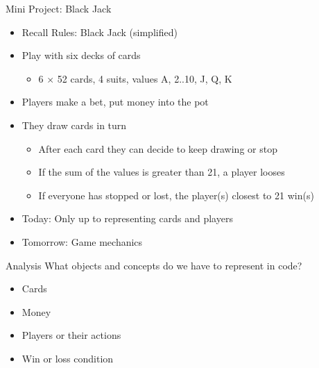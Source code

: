 \begin{frame}[fragile]{Mini Project: Black Jack}
%
\begin{itemize}
\item Recall Rules: Black Jack (simplified)
\item Play with six decks of cards
	\begin{itemize}
	\item 6 $\times$ 52 cards, 4 suits, values A, 2..10, J, Q, K
	\end{itemize}
\item Players make a bet, put money into the pot
\item They draw cards in turn
	\begin{itemize}
	\item After each card they can decide to keep drawing or stop
	\item If the sum of the values is greater than 21, a player looses
	\item If everyone has stopped or lost, the player(s) closest to 21 win(s)
	\end{itemize}
\item Today: Only up to representing cards and players
\item Tomorrow: Game mechanics
\end{itemize}
%
\end{frame}


\begin{frame}[fragile]{Analysis}
%
What objects and concepts do we have to represent in code?
\begin{itemize}
\item Cards
\item Money
\item Players or their actions
\item Win or loss condition
\end{itemize}
%
\end{frame}


